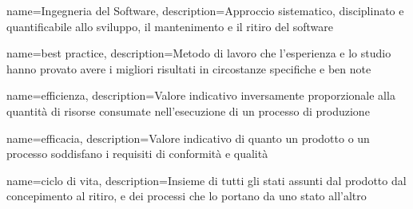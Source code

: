 {
	name={Ingegneria del Software},
	description={Approccio sistematico, disciplinato e quantificabile allo sviluppo, il mantenimento e il ritiro del software}
}

{
	name={best practice},
	description={Metodo di lavoro che l'esperienza e lo studio hanno provato avere i migliori risultati in circostanze specifiche e ben note}
}

{
	name=efficienza,
	description={Valore indicativo inversamente proporzionale alla quantità di risorse consumate nell'esecuzione di un processo di produzione}
}

{
	name=efficacia,
	description={Valore indicativo di quanto un prodotto o un processo soddisfano i requisiti di conformità e qualità}
}

{
	name={ciclo di vita},
	description={Insieme di tutti gli stati assunti dal prodotto dal concepimento al ritiro, e dei processi che lo portano da uno stato all'altro}
}